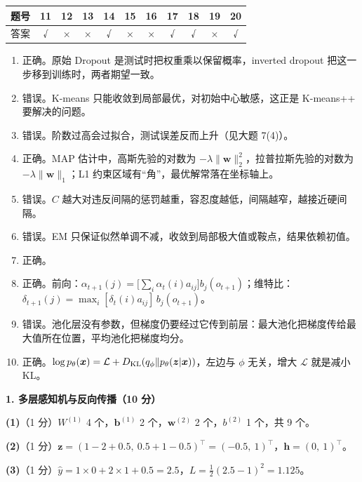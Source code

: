 \begin{center}
\renewcommand{\arraystretch}{1.3}
\begin{tabular}{|c|*{10}{c|}}\hline
题号 & 11 & 12 & 13 & 14 & 15 & 16 & 17 & 18 & 19 & 20\\ \hline
答案 & √ & × & × & √ & × & × & √ & √ & × & √\\ \hline
\end{tabular}
\end{center}
\begin{enumerate}[label=\arabic*.,start=11]
\item 正确。原始 Dropout 是测试时把权重乘以保留概率，inverted dropout 把这一步移到训练时，两者期望一致。
\item 错误。K-means 只能收敛到局部最优，对初始中心敏感，这正是 K-means++ 要解决的问题。
\item 错误。阶数过高会过拟合，测试误差反而上升（见大题 7(4)）。
\item 正确。MAP 估计中，高斯先验的对数为 $-\lambda\|\bm w\|_2^2$，拉普拉斯先验的对数为 $-\lambda\|\bm w\|_1$；L1 约束区域有“角”，最优解常落在坐标轴上。
\item 错误。$C$ 越大对违反间隔的惩罚越重，容忍度越低，间隔越窄，越接近硬间隔。
\item 错误。EM 只保证似然单调不减，收敛到局部极大值或鞍点，结果依赖初值。
\item 正确。
\item 正确。前向：$\alpha_{t+1}(j)=\big[\sum_i\alpha_t(i)a_{ij}\big]b_j(o_{t+1})$；维特比：$\delta_{t+1}(j)=\max_i[\delta_t(i)a_{ij}]\,b_j(o_{t+1})$。
\item 错误。池化层没有参数，但梯度仍要经过它传到前层：最大池化把梯度传给最大值所在位置，平均池化把梯度均分。
\item 正确。$\log p_\theta(\bm x)=\mathcal L+D_{\mathrm{KL}}(q_\phi\|p_\theta(\bm z|\bm x))$，左边与 $\phi$ 无关，增大 $\mathcal L$ 就是减小 KL。
\end{enumerate}

\noindent\textbf{1. 多层感知机与反向传播（10 分）}

\textbf{(1)}（1 分）$W^{(1)}$ 4 个，$\bm b^{(1)}$ 2 个，$\bm w^{(2)}$ 2 个，$b^{(2)}$ 1 个，共 9 个。

\textbf{(2)}（1 分）$\bm z=(1-2+0.5,\ 0.5+1-0.5)^\top=(-0.5,\ 1)^\top$，$\bm h=(0,\ 1)^\top$。

\textbf{(3)}（1 分）$\hat y=1\times0+2\times1+0.5=2.5$，$L=\frac12(2.5-1)^2=1.125$。

